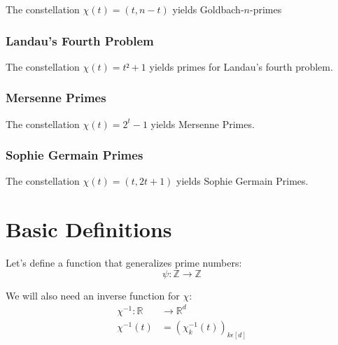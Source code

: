 \documentclass{article}
\newcommand{\inv}{^{-1}}
\begin{document}
	\medskip
	
	The constellation $χ(t)= (t, n-t)$ yields Goldbach-$n$-primes
	
	\subsubsection{Landau's Fourth Problem}
	
	The constellation $χ(t)= t²+1$ yields primes for Landau's fourth problem.
	
	\subsubsection{Mersenne Primes}
	
	The constellation $χ(t) = 2^t-1$ yields Mersenne Primes.
	
	\subsubsection{Sophie Germain Primes}
	
	The constellation $χ(t) = (t, 2t+1)$ yields Sophie Germain Primes.
	
	\section{Basic Definitions}
	
	Let's define a function that generalizes prime numbers:
	\begin{equation}
		ψ: ℤ → ℤ
	\end{equation}
	
	We will also need an inverse function for $χ$:
	\begin{equation}
		\begin{split}
			χ\inv : ℝ &→ ℝ^d \\
			χ\inv(t) &= (χ\inv_k(t))_{kϵ[d]}
		\end{split}
	\end{equation}
	
\end{document}

